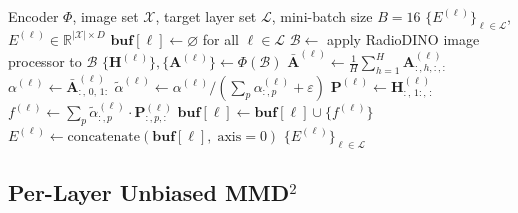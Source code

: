 \documentclass[lettersize,journal]{IEEEtran}
\begin{document}
\begin{algorithm}[t]
\caption{Attention-aware feature extraction}
\label{alg:extraction}
\begin{algorithmic}[1]
\Require Encoder $\Phi$, image set $\mathcal{X}$,
         target layer set $\mathcal{L}$,
         mini-batch size $B = 16$
\Ensure  $\{E^{(\ell)}\}_{\ell \in \mathcal{L}}$,
         $E^{(\ell)} \in \mathbb{R}^{|\mathcal{X}| \times D}$
\State $\mathbf{buf}[\ell] \leftarrow \varnothing$ for all $\ell \in \mathcal{L}$
  \State $\mathcal{B} \leftarrow$ apply RadioDINO image processor to $\mathcal{B}$
  \State $\{\mathbf{H}^{(\ell)}\}, \{\mathbf{A}^{(\ell)}\}
         \leftarrow \Phi(\mathcal{B})$
    \State $\bar{\mathbf{A}}^{(\ell)} \leftarrow
           \frac{1}{H}\sum_{h=1}^{H} \mathbf{A}^{(\ell)}_{:,h,:,:}$
    \State $\alpha^{(\ell)} \leftarrow
           \bar{\mathbf{A}}^{(\ell)}_{:,\, 0,\, 1:}$
    \State $\tilde{\alpha}^{(\ell)} \leftarrow
           \alpha^{(\ell)} /
           (\sum_p \alpha^{(\ell)}_{:,p} + \varepsilon)$
    \State $\mathbf{P}^{(\ell)} \leftarrow
           \mathbf{H}^{(\ell)}_{:,\, 1:,\, :}$
    \State $f^{(\ell)} \leftarrow
           \sum_p \tilde{\alpha}^{(\ell)}_{:,p} \cdot
           \mathbf{P}^{(\ell)}_{:,p,:}$
    \State $\mathbf{buf}[\ell] \leftarrow
           \mathbf{buf}[\ell] \cup \{f^{(\ell)}\}$
  \EndFor
\EndFor
{}
  \State $E^{(\ell)} \leftarrow \mathrm{concatenate}(\mathbf{buf}[\ell],
         \;\mathrm{axis}{=}0)$
\EndFor
\State \Return $\{E^{(\ell)}\}_{\ell \in \mathcal{L}}$
\end{algorithmic}
\end{algorithm}


\subsection{Per-Layer Unbiased MMD$^2$}
\label{sec:method_mmd}
\end{document}
